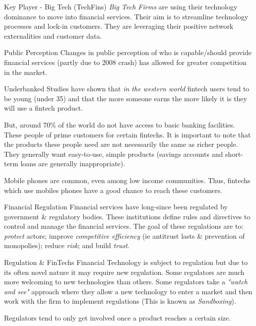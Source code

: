\documentclass[11pt,a4paper]{article}
\begin{document}
\begin{proposition}{Key Player - Big Tech (TechFins)}
  \textit{Big Tech Firms} are using their technology dominance to move into financial services. Their aim is to streamline technology processes and lock-in customers. They are leveraging their positive network externalities and customer data.
\end{proposition}

\begin{remark}{Public Perception}
  Changes in public perception of who is capable/should provide financial services (partly due to 2008 crash) has allowed for greater competition in the market.
\end{remark}

\begin{remark}{Underbanked}
  Studies have shown that \textit{in the western world} fintech users tend to be young (under 35) and that the more someone earns the more likely it is they will use a fintech product.
  \par But, around 70\% of the world do not have access to basic banking facilities. These people of prime customers for certain fintechs. It is important to note that the products these people need are not necessarily the same as richer people. They generally want easy-to-use, simple products (savings accounts and short-term loans are generally inappropriate).
  \par Mobile phones are common, even among low income communities. Thus, fintechs which use mobiles phones have a good chance to reach these customers.
\end{remark}

\begin{definition}{Financial Regulation}
  Financial services have long-since been regulated by government \& regulatory bodies. These institutions define rules and directives to control and manage the financial services. The goal of these regulations are to: \textit{protect} actors; improve \textit{competitive efficiency} (ie antitrust lasts \& prevention of monopolies); reduce \textit{risk}; and build \textit{trust}.
\end{definition}

\begin{remark}{Regulation \& FinTechs}
  Financial Technology is subject to regulation but due to its often novel nature it may require new regulation. Some regulators are much more welcoming to new technologies than others. Some regulators take a \textit{"watch and see"} approach where they allow a new technology to enter a market and then work with the firm to implement regulations (This is known as \textit{Sandboxing}).
  \par Regulators tend to only get involved once a product reaches a certain size.
\end{remark}
\end{document}
